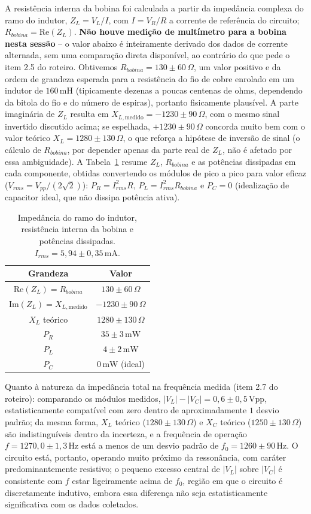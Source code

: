 \documentclass[12pt]{article}
\begin{document}
A resistência interna da bobina foi calculada a partir da impedância complexa do ramo do indutor, $Z_L=V_L/I$, com $I=V_R/R$ a corrente de referência do circuito; $R_{bobina}=\text{Re}(Z_L)$. \textbf{Não houve medição de multímetro para a bobina nesta sessão} -- o valor abaixo é inteiramente derivado dos dados de corrente alternada, sem uma comparação direta disponível, ao contrário do que pede o item 2.5 do roteiro. Obtivemos $R_{bobina}=130\pm60\,\Omega$, um valor positivo e da ordem de grandeza esperada para a resistência do fio de cobre enrolado em um indutor de $160\,\text{mH}$ (tipicamente dezenas a poucas centenas de ohms, dependendo da bitola do fio e do número de espiras), portanto fisicamente plausível. A parte imaginária de $Z_L$ resulta em $X_{L,\text{medido}}=-1230\pm90\,\Omega$, com o mesmo sinal invertido discutido acima; se espelhada, $+1230\pm90\,\Omega$ concorda muito bem com o valor teórico $X_L=1280\pm130\,\Omega$, o que reforça a hipótese de inversão de sinal (o cálculo de $R_{bobina}$, por depender apenas da parte real de $Z_L$, não é afetado por essa ambiguidade). A Tabela~\ref{tab:potencias} resume $Z_L$, $R_{bobina}$ e as potências dissipadas em cada componente, obtidas convertendo os módulos de pico a pico para valor eficaz ($V_{rms}=V_{pp}/(2\sqrt2)$): $P_R=I_{rms}^2R$, $P_L=I_{rms}^2R_{bobina}$ e $P_C=0$ (idealização de capacitor ideal, que não dissipa potência ativa).

\begin{table}[htb]
	\caption{\label{tab:potencias} Impedância do ramo do indutor, resistência interna da bobina e potências dissipadas. $I_{rms}=5{,}94\pm0{,}35\,\text{mA}$.}
	\centering
	\begin{tabular}{cc}
		\hline\hline
		Grandeza & Valor \\ \hline
		$\text{Re}(Z_L)=R_{bobina}$ & $130\pm60\,\Omega$ \\
		$\text{Im}(Z_L)=X_{L,\text{medido}}$ & $-1230\pm90\,\Omega$ \\
		$X_L$ teórico & $1280\pm130\,\Omega$ \\
		$P_R$ & $35\pm3\,\text{mW}$ \\
		$P_L$ & $4\pm2\,\text{mW}$ \\
		$P_C$ & $0\,\text{mW}$ (ideal) \\ \hline\hline
	\end{tabular}
\end{table}

Quanto à natureza da impedância total na frequência medida (item 2.7 do roteiro): comparando os módulos medidos, $|V_L|-|V_C|=0{,}6\pm0{,}5\,\text{Vpp}$, estatisticamente compatível com zero dentro de aproximadamente $1$ desvio padrão; da mesma forma, $X_L$ teórico ($1280\pm130\,\Omega$) e $X_C$ teórico ($1250\pm130\,\Omega$) são indistinguíveis dentro da incerteza, e a frequência de operação $f=1270{,}0\pm1{,}3\,\text{Hz}$ está a menos de um desvio padrão de $f_0=1260\pm90\,\text{Hz}$. O circuito está, portanto, operando muito próximo da ressonância, com caráter predominantemente resistivo; o pequeno excesso central de $|V_L|$ sobre $|V_C|$ é consistente com $f$ estar ligeiramente acima de $f_0$, região em que o circuito é discretamente indutivo, embora essa diferença não seja estatisticamente significativa com os dados coletados.
\end{document}
